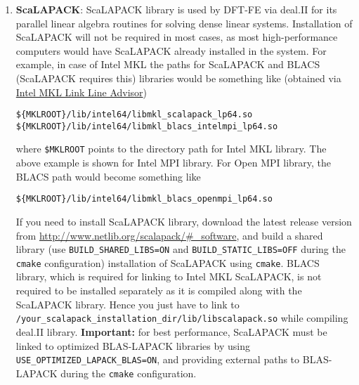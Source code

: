 \begin{enumerate}
\item {\bf ScaLAPACK}: ScaLAPACK library is used by DFT-FE via deal.II for its parallel linear algebra routines for solving dense linear systems. Installation of ScaLAPACK will not be required in most cases, as most high-performance computers would have ScaLAPACK already installed in the system. For example, in case of Intel MKL the paths for ScaLAPACK and BLACS (ScaLAPACK requires this) libraries would be something like (obtained via \href{https://software.intel.com/en-us/articles/intel-mkl-link-line-advisor}{Intel MKL Link Line Advisor})
\begin{verbatim}
${MKLROOT}/lib/intel64/libmkl_scalapack_lp64.so
${MKLROOT}/lib/intel64/libmkl_blacs_intelmpi_lp64.so
\end{verbatim}
where \verb|$MKLROOT| points to the directory path for Intel MKL library. The above example is shown for Intel MPI library. For Open MPI library, the BLACS path would become something like
\begin{verbatim}
${MKLROOT}/lib/intel64/libmkl_blacs_openmpi_lp64.so
\end{verbatim}

If you need to install ScaLAPACK library, download the latest release version from \url{http://www.netlib.org/scalapack/#\_software}, and build a shared library (use \verb|BUILD_SHARED_LIBS=ON| and \verb|BUILD_STATIC_LIBS=OFF|  during the \verb|cmake| configuration) installation of ScaLAPACK using \verb|cmake|. BLACS library, which is required for linking to Intel MKL ScaLAPACK, is not required to be installed separately as it is compiled along with the ScaLAPACK library. Hence you just have to link to \verb|/your_scalapack_installation_dir/lib/libscalapack.so| while compiling deal.II library. {\bf Important: } for best performance, ScaLAPACK must be linked to optimized BLAS-LAPACK libraries by using \verb|USE_OPTIMIZED_LAPACK_BLAS=ON|, and providing external paths to BLAS-LAPACK during the \verb|cmake| configuration.   	
\end{enumerate}

